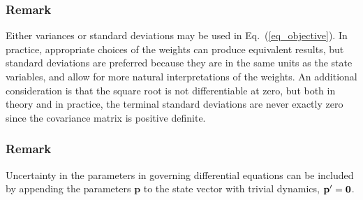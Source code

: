 \documentclass[journal ]{new-aiaa}
\newcommand{\state}{\ensuremath{\mathbf{x}}}
\newcommand{\ur}{\ensuremath{u_{\mathrm{ref}}}}
\newcommand{\param}{\ensuremath{\mathbf{p}}}
\newcommand{\E}[1]{\mathbb{E}\left[#1\right]}
\newcommand{\V}[1]{\mathbb{V}[#1]}
\newcommand{\cov}{C}
\begin{document}
\subsubsection*{Remark} Either variances or standard deviations may be used in Eq.~(\ref{eq_objective}). In practice, appropriate choices of the weights can produce equivalent results, but standard deviations are preferred because they are in the same units as the state variables, and allow for more natural interpretations of the weights. An additional consideration is that the square root is not differentiable at zero, but both in theory and in practice, the terminal standard deviations are never exactly zero since the covariance matrix is positive definite.
\subsubsection*{Remark} Uncertainty in the parameters in governing differential equations can be included by appending the parameters $\param$ to the state vector with trivial dynamics, $\param'=\bf0$.
\end{document}
